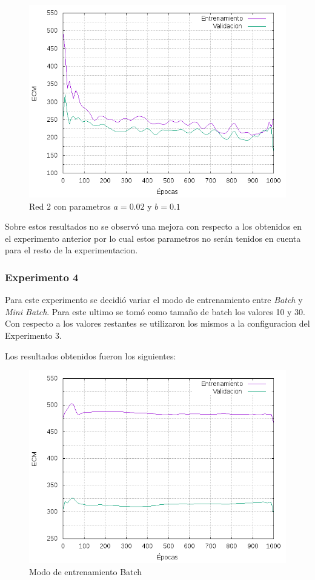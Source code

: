 \begin{figure}[H]
  \includegraphics[width=125mm]{imagenes/ej1/ex_3-2_red_11-6-6-9-1_errors.png}
  \caption{Red 2 con parametros $a = 0.02 $ y $b = 0.1$}
\end{figure}

Sobre estos resultados no se observó una mejora con respecto a los obtenidos en el experimento anterior por lo cual estos parametros no serán
tenidos en cuenta para el resto de la experimentacion.

\subsubsection{Experimento 4}
Para este experimento se decidió variar el modo de entrenamiento entre \textit{Batch} y \textit{Mini Batch}. Para este ultimo se tomó como tamaño
de batch los valores 10 y 30. Con respecto a los valores restantes se utilizaron los mismos a la configuracion del Experimento 3.

Los resultados obtenidos fueron los siguientes:

\begin{figure}[H]
  \includegraphics[width=125mm]{imagenes/ej1/ex_4-1_red_11-6-6-9-1_errors.png}
  \caption{Modo de entrenamiento Batch}
\end{figure}

